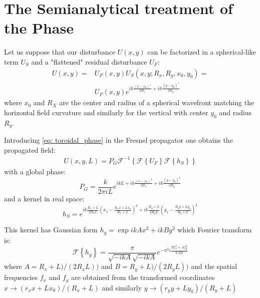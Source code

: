 \documentclass{iucr}              %
\begin{document}
\section{The Semianalytical treatment of the Phase}
\label{appendix_srw}
Let us suppose that our disturbance $U(x,y)$ can be factorized in a spherical-like term $U_S$ and a "flattened" residual disturbance $U_F$: 
\begin{equation}\label{eq: toroidal_phase}
	\begin{aligned}
	U(x, y) = & U_F(x,y) U_S(x,y;R_x,R_y,x_0,y_0) = \\
	          & U_F(x,y) e^{i k \frac{(x-x_0)^1}{2R_x}+i k \frac{(y-y_0)^1}{2R_y}}
\end{aligned}
\end{equation}
where $x_0$ and $R_X$ are the center and radius of a spherical wavefront matching the horizontal field curvature and similarly for the vertical with center $y_0$ and radius $R_y$. 

Introducing \ref{eq: toroidal_phase} in the Fresnel propagator one obtains the propagated field: 
\begin{equation}\label{eq: srw spherical phase}
	\begin{aligned}
	U(x, y, L) = P_G \mathcal{F}^{-1} \left\{  
	    \mathcal{F} \left\{ U_F \right\}
	    \mathcal{F} \left\{ h_S \right\}
	                                      \right\}
\end{aligned}
\end{equation}
with a global phase:
\begin{equation}\label{eq: srw global phase}
	P_G =  \frac{k}{2 \pi i L} e^{i k L + i k \frac{(x-x_0)^2}{2 R_x}+ i k \frac{(y-y_0)^2}{2 R_y}}
\end{equation}
and a kernel in real space: 
\begin{equation}\label{eq: srw global phase}
	h_S =  e^{
	  i k \frac{R_x+L}{2 R_x L} \left( x_1 - \frac{R_x x + L x_0}{R_x + L } \right) ^2 + 
	  i k \frac{R_y+L}{2 R_y L} \left( y_1 - \frac{R_y y + L y_0}{R_y + L } \right) ^2
	         }
\end{equation}

This kernel has Gaussian form $h_g = \exp{i k A x^2 + i k B y^2}$ which Fourier transform is: 
\begin{equation}
    \mathcal{F} \left\{ h_g \right\} = \frac{\pi}{\sqrt{-i k A}\sqrt{-i k A}} 
    e^{- \pi^2 i \frac{B f_x^2 + A f_y^2}{k A B}}
\end{equation}
where $A=R_x+L)/(2 R_x L))$ and $B=R_y+L)/(2 R_y L))$ and the spatial frequencies $f_x$ and $f_y$ are obtained from the transformed coordinates $x \rightarrow (r_x x + L x_0)/(R_x + L)$ and similarly $y \rightarrow (r_y y + L y_0)/(R_y + L)$
\end{document}
